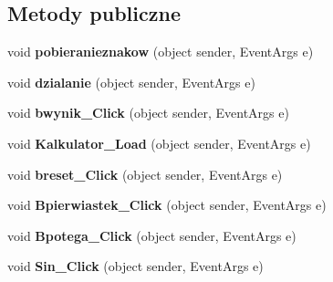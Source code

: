 \subsection*{Metody publiczne}
\begin{DoxyCompactItemize}
\item 
\mbox{\label{classkalku__all__in__one_1_1_kalkulator_a3243bcd8324a673e6e5dfc012b057709}} 
void {\bfseries pobieranieznakow} (object sender, Event\+Args e)
\item 
\mbox{\label{classkalku__all__in__one_1_1_kalkulator_ae6ecdb5e2624e2d7b85e40fbb72c71d0}} 
void {\bfseries dzialanie} (object sender, Event\+Args e)
\item 
\mbox{\label{classkalku__all__in__one_1_1_kalkulator_ae31aba2077dde4cd5e33a4276c54cc01}} 
void {\bfseries bwynik\+\_\+\+Click} (object sender, Event\+Args e)
\item 
\mbox{\label{classkalku__all__in__one_1_1_kalkulator_a08d2aa2740d65a5dbd471f53475f5c63}} 
void {\bfseries Kalkulator\+\_\+\+Load} (object sender, Event\+Args e)
\item 
\mbox{\label{classkalku__all__in__one_1_1_kalkulator_ae67c5089c8e37891bdbc6243122ff036}} 
void {\bfseries breset\+\_\+\+Click} (object sender, Event\+Args e)
\item 
\mbox{\label{classkalku__all__in__one_1_1_kalkulator_acdd282e8facf033fd0b6e9db6a716380}} 
void {\bfseries Bpierwiastek\+\_\+\+Click} (object sender, Event\+Args e)
\item 
\mbox{\label{classkalku__all__in__one_1_1_kalkulator_a6ad4c6aa5f732865ea288fbfdf39cc79}} 
void {\bfseries Bpotega\+\_\+\+Click} (object sender, Event\+Args e)
\item 
\mbox{\label{classkalku__all__in__one_1_1_kalkulator_a9401f5b885ce5d1ac3aa225379765064}} 
void {\bfseries Sin\+\_\+\+Click} (object sender, Event\+Args e)
\item 

\end{DoxyCompactItemize}
